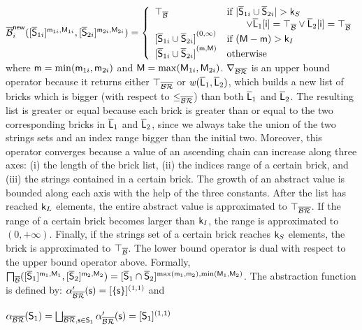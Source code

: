 \documentclass[orivec]{llncs}
\begin{document}
$
\mathsf{\overline{\mathcal{B}}}_i^{\mathsf{new}}([\mathsf{\overline{S}}_{1i}]^{\mathsf{m}_{1i},\mathsf{M}_{1i}}, [\mathsf{\overline{S}}_{2i}]^{\mathsf{m}_{2i},\mathsf{M}_{2i}}) =
\left\{ 
\begin{array}{ll}
\top_{\mathsf{\overline{\mathcal{B}}}} & \mbox{if } | \mathsf{\overline{S}}_{1i} \cup \mathsf{\overline{S}}_{2i} | > \mathsf{k}_S\\
& \hspace{20pt} \lor \mathsf{\overline{L}}_1[\mathsf{i}] = \top_{\mathsf{\overline{\mathcal{B}}}} \lor \mathsf{\overline{L}}_2[\mathsf{i}] = \top_{\mathsf{\overline{\mathcal{B}}}}\\
{[\mathsf{\overline{S}}_{1i} \cup \mathsf{\overline{S}}_{2i}]}^{(0, \infty)} & \mbox{if } (\mathsf{M} - \mathsf{m}) > \mathsf{k}_I\\
{[\mathsf{\overline{S}}_{1i} \cup \mathsf{\overline{S}}_{2i}]}^{(\mathsf{m}, \mathsf{M})} & \mbox{otherwise}
\end{array}\right. 
$
where $\mathsf{m} = \min(\mathsf{m}_{1i},\mathsf{m}_{2i})$ and $\mathsf{M} =\max(\mathsf{M}_{1i},\mathsf{M}_{2i})$.
$\nabla_{\mathsf{\overline{\mathsf{\mathcal{BR}}}}}$ is an upper bound operator because it returns either $\top_{\mathsf{\overline{\mathsf{\mathcal{BR}}}}}$ or $\mathit{w}(\mathsf{\overline{L}}_1,\mathsf{\overline{L}}_2)$, which builds a new list of bricks which is bigger (with respect to $\le_{\mathsf{\overline{\mathsf{\mathcal{BR}}}}}$) than both $\mathsf{\overline{L}}_1$ and $\mathsf{\overline{L}}_2$. The resulting list is greater or equal because each brick is greater than or equal to the two corresponding bricks in $\mathsf{\overline{L}}_1$ and $\mathsf{\overline{L}}_2$, since we always take the union of the two strings sets and an index range bigger than the initial two. Moreover, this operator converges because a value of an ascending chain can increase along three axes: (i) the length of the brick list, (ii) the indices range of a certain brick, and (iii) the strings contained in a certain brick. The growth of an abstract value is bounded along each axis with the help of the three constants. After the list has reached $\mathsf{k}_L$ elements, the entire abstract value is approximated to $\top_{\mathsf{\overline{\mathsf{\mathcal{BR}}}}}$. If the range of a certain brick becomes larger than $\mathsf{k}_I$, the range is approximated to $(0,+\infty)$. Finally, if the strings set of a certain brick reaches $\mathsf{k}_S$ elements, the brick is approximated to $\top_{\mathsf{\overline{\mathcal{B}}}}$. The lower bound operator is dual with respect to the upper bound operator above. Formally, $\bigsqcap_{\mathsf{\overline{\mathcal{B}}}}([\mathsf{\overline{S}}_1]^{\mathsf{m}_1,\mathsf{M}_1}, [\mathsf{\overline{S}}_2]^{\mathsf{m}_2,\mathsf{M}_2}) = [\mathsf{\overline{S}}_1 \cap \mathsf{\overline{S}}_2]^{\max(\mathsf{m}_1,\mathsf{m}_2), \min(\mathsf{M}_1,\mathsf{M}_2)}$. The abstraction function is defined by: $\alpha_{\mathsf{\overline{\mathsf{\mathcal{BR}}}}}^\prime(\mathsf{s}) = [\{\mathsf{s}\}]^{(1,1)}$ and 
 
$\alpha_{\mathsf{\overline{\mathsf{\mathcal{BR}}}}}(\mathsf{S}_1) = \bigsqcup_{\mathsf{\overline{\mathsf{\mathcal{BR}}}}, \mathsf{s} \in \mathsf{S}_1}{\alpha_{\mathsf{\overline{\mathsf{\mathcal{BR}}}}}^\prime(\mathsf{s})} = [\mathsf{S}_1]^{(1,1)} 
$ 
\end{document}

